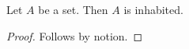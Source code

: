 

\begin{proposition}\label{horn_choice_missing}
    Let $A$ be a set.
    Then $A$ is inhabited.
\end{proposition}
\begin{proof}
    Follows by notion.
\end{proof}
